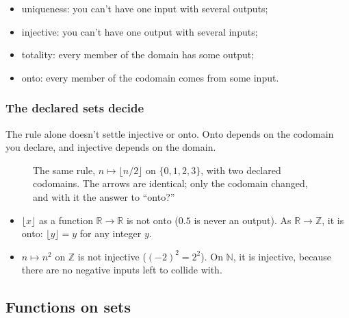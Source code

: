 \begin{itemize}
\item uniqueness: you can't have one input with several outputs;
\item injective: you can't have one output with several inputs;
\item totality: every member of the domain has some output;
\item onto: every member of the codomain comes from some input.
\end{itemize}

\subsubsection{The declared sets decide}

The rule alone doesn't settle injective or onto. Onto depends on the codomain you declare, and injective depends on the domain.

\begin{figure}[H]
\centering
{}
\caption{The same rule, $n\mapsto\lfloor n/2\rfloor$ on $\{0,1,2,3\}$, with two declared codomains. The arrows are identical; only the codomain changed, and with it the answer to ``onto?''}
\end{figure}

\begin{itemize}
\item $\lfloor x\rfloor$ as a function $\mathbb{R}\to\mathbb{R}$ is not onto ($0.5$ is never an output). As $\mathbb{R}\to\mathbb{Z}$, it is onto: $\lfloor y\rfloor=y$ for any integer $y$.
\item $n\mapsto n^2$ on $\mathbb{Z}$ is not injective ($(-2)^2=2^2$). On $\mathbb{N}$, it is injective, because there are no negative inputs left to collide with.
\end{itemize}

\subsection{Functions on sets}

